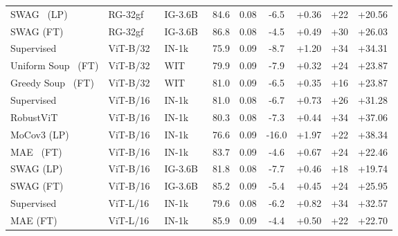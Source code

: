 \documentclass[10pt,twocolumn,letterpaper]{article}
\begin{document}
\begin{table*}[h]
\begin{adjustbox}{width=\linewidth}
\begin{tabular}{@{}lll|cc|cc|cc@{}}
SWAG~\cite{singh2022IEEECVFConf.Comput.Vis.PatternRecognit.CVPRRevisiting} (LP) & RG-32gf      & IG-3.6B~\cite{singh2022IEEECVFConf.Comput.Vis.PatternRecognit.CVPRRevisiting}  & 84.6  &    0.08                   & -6.5  &  +0.36      & +22  &  +20.56         \\
SWAG (FT) & RG-32gf      & IG-3.6B  & 86.8  &    0.08          & -4.5 & +0.49        & +30   &  +26.03        \\ \midrule
Supervised       & ViT-B/32~\cite{dosovitskiy2021Int.Conf.Learn.Represent.Image}     & IN-1k      & 75.9     & 0.09      & -8.7         & +1.20              & +34        & +34.31                      \\
Uniform Soup~\cite{wortsman2022Int.Conf.Mach.Learn.Model} (FT) & ViT-B/32        & WIT~\cite{radford2021Int.Conf.Mach.Learn.Learning}   & 79.9       &   0.09      & -7.9  &  +0.32      & +24  &   +23.87        \\
Greedy Soup~\cite{wortsman2022Int.Conf.Mach.Learn.Model} (FT) & ViT-B/32        & WIT   & 81.0       &   0.09      & -6.5  &  +0.35      & +16  &   +23.87        \\ \midrule
Supervised     & ViT-B/16        & IN-1k                       & 81.0     &  0.08                  & -6.7 &   +0.73      & +26 & +31.28            \\
RobustViT~\cite{chefer2022Adv.NeuralInf.Process.Syst.Optimizing}     & ViT-B/16        & IN-1k                       & 80.3     &  0.08                  & -7.3 &   +0.44      & +34 & +37.06            \\
MoCov3 (LP)     & ViT-B/16        & IN-1k                       & 76.6      &   0.09                & -16.0 &  +1.97       & +22 &     +38.34       \\
MAE~\cite{he2022IEEECVFConf.Comput.Vis.PatternRecognit.CVPRMasked} (FT)  & ViT-B/16        & IN-1k & 83.7   &    0.09                  & -4.6 &  +0.67   & +24 &    +22.46        \\
SWAG (LP) & ViT-B/16        & IG-3.6B  & 81.8    &  0.08  & -7.7  &  +0.46  & +18   &   +19.74       \\
SWAG (FT) & ViT-B/16        & IG-3.6B   & 85.2       &   0.09      & -5.4  &  +0.45      & +24   &  +25.95        \\ \midrule
Supervised    & ViT-L/16        & IN-1k   & 79.6    &   0.08      & -6.2 & +0.82 & +34 & +32.57 \\
MAE (FT)    & ViT-L/16        & IN-1k                    & 85.9    &   0.09                  & -4.4 & +0.50 & +22 & +22.70 \\

\end{tabular}
\end{adjustbox}
\end{table*}
\end{document}
